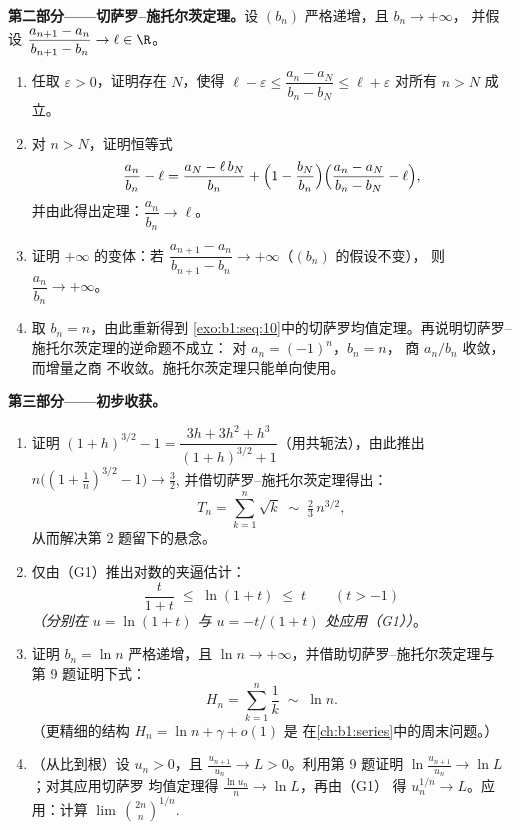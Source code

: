 \begin{problem}[{周末问题——切萨罗--施托尔茨定理，
以及 $u_n \sim \sqrt{3/n}$ 的渐近性，对于 $u_{n+1} = \sin
u_n$}]
\medskip
\noindent\textbf{第二部分——切萨罗--施托尔茨定理。}设
        $(b_n)$ 严格递增，且 $b_n \to +\infty$，
        并假设 $\dfrac{a_{n+1} - a_n}{b_{n+1} - b_n} \to \ell \in \R$。
\begin{enumerate}[resume]
  \item 任取 $\varepsilon > 0$，证明存在 $N$，使得
        $\ell - \varepsilon \leq \dfrac{a_n - a_N}{b_n - b_N}
        \leq \ell + \varepsilon$ 对所有 $n > N$ 成立。
  \item 对 $n > N$，证明恒等式
        \[
        \frac{a_n}{b_n} - \ell
        = \frac{a_N - \ell\,b_N}{b_n}
        + \Bigl(1 - \frac{b_N}{b_n}\Bigr)
        \Bigl(\frac{a_n - a_N}{b_n - b_N} - \ell\Bigr),
        \]
        并由此得出定理：$\dfrac{a_n}{b_n} \to \ell$。
  \item 证明 $+\infty$ 的变体：若 $\dfrac{a_{n+1} -
        a_n}{b_{n+1} - b_n} \to +\infty$（$(b_n)$ 的假设不变），
        则 $\dfrac{a_n}{b_n} \to +\infty$。
  \item 取 $b_n = n$，由此重新得到
        \cref{exo:b1:seq:10}中的切萨罗均值定理。再说明切萨罗--施托尔茨定理的逆命题不成立：
        对 $a_n = (-1)^n$，$b_n = n$，
        商 $a_n/b_n$ 收敛，而增量之商
        不收敛。施托尔茨定理只能单向使用。
\end{enumerate}

\medskip
\noindent\textbf{第三部分——初步收获。}
\begin{enumerate}[resume]
  \item 证明 $(1+h)^{3/2} - 1 = \dfrac{3h + 3h^2 +
        h^3}{(1+h)^{3/2} + 1}$（用共轭法），由此推出
        $n\bigl((1 + \tfrac1n)^{3/2} - 1\bigr) \to \tfrac32$,
        并借切萨罗--施托尔茨定理得出：
        \[
        T_n = \sum_{k=1}^{n} \sqrt k \;\sim\; \tfrac23\,
        n^{3/2} ,
        \]
        从而解决第 2 题留下的悬念。
  \item 仅由（G1）推出对数的夹逼估计：
        \[
        \frac{t}{1 + t} \;\leq\; \ln(1 + t) \;\leq\; t
        \qquad (t > -1)
        \]
        \emph{（分别在 $u = \ln(1+t)$ 与 $u =
        -t/(1+t)$ 处应用（G1））}。
  \item 证明 $b_n = \ln n$ 严格递增，且
        $\ln n \to +\infty$，并借助切萨罗--施托尔茨定理与
        第 9 题证明下式：
        \[
        H_n = \sum_{k=1}^{n} \frac 1k \;\sim\; \ln n .
        \]
        （更精细的结构 $H_n = \ln n + \gamma + o(1)$ 是
        在\cref{ch:b1:series}中的周末问题。）
  \item （从比到根）设 $u_n > 0$，且
        $\frac{u_{n+1}}{u_n} \to L > 0$。利用第 9 题证明
        $\ln\frac{u_{n+1}}{u_n} \to \ln L$；对其应用切萨罗
        均值定理得 $\frac{\ln u_n}{n} \to \ln L$，再由（G1）
        得 $u_n^{1/n} \to L$。应用：计算
        $\lim\,\binom{2n}{n}^{1/n}$.
\end{enumerate}


\end{problem}

